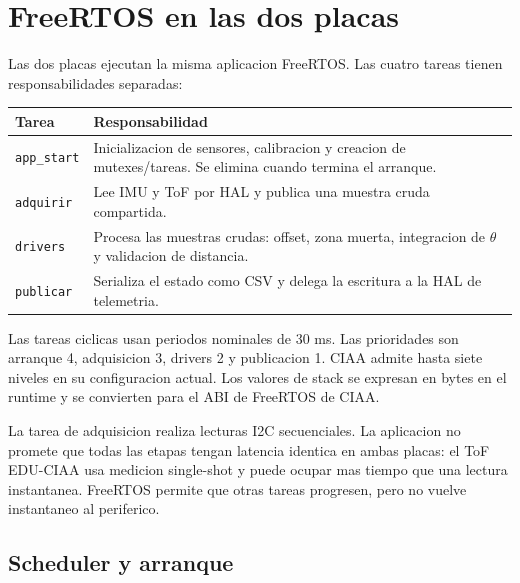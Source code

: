 \documentclass[11pt,a4paper]{article}
\begin{document}
\section{FreeRTOS en las dos placas}

Las dos placas ejecutan la misma aplicacion FreeRTOS. Las cuatro tareas tienen
responsabilidades separadas:

\begin{longtable}{>{\raggedright\arraybackslash}p{}
                  >{\raggedright\arraybackslash}p{}}
\textbf{Tarea} & \textbf{Responsabilidad} \\
\hline
\texttt{app\_start} & Inicializacion de sensores, calibracion y creacion de
mutexes/tareas. Se elimina cuando termina el arranque. \\
\texttt{adquirir} & Lee IMU y ToF por HAL y publica una muestra cruda compartida. \\
\texttt{drivers} & Procesa las muestras crudas: offset, zona muerta, integracion
de $\theta$ y validacion de distancia. \\
\texttt{publicar} & Serializa el estado como CSV y delega la escritura a la HAL
de telemetria. \\
\end{longtable}

Las tareas ciclicas usan periodos nominales de 30 ms. Las prioridades son
arranque 4, adquisicion 3, drivers 2 y publicacion 1. CIAA admite hasta siete
niveles en su configuracion actual. Los valores de stack se expresan en bytes en
el runtime y se convierten para el ABI de FreeRTOS de CIAA.

La tarea de adquisicion realiza lecturas I2C secuenciales. La aplicacion no
promete que todas las etapas tengan latencia identica en ambas placas: el ToF
EDU-CIAA usa medicion single-shot y puede ocupar mas tiempo que una lectura
instantanea. FreeRTOS permite que otras tareas progresen, pero no vuelve
instantaneo al periferico.

\subsection{Scheduler y arranque}
\end{document}
